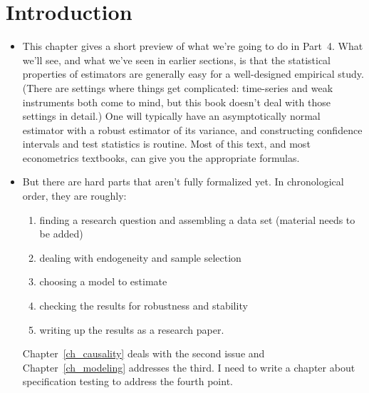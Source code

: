 

\section{Introduction}

\begin{itemize}[leftmargin=0pt]

\item This chapter gives a short preview of what we're going to do in
  Part~4. What we'll see, and what we've seen in earlier sections, is
  that the statistical properties of estimators are generally easy for
  a well-designed empirical study. (There are settings where things
  get complicated: time-series and weak instruments both come to mind,
  but this book doesn't deal with those settings in detail.) One will
  typically have an asymptotically normal estimator with a robust
  estimator of its variance, and constructing confidence intervals and
  test statistics is routine.  Most of this text, and most
  econometrics textbooks, can give you the appropriate formulas.

\item But there are hard parts that aren't fully formalized yet. In
  chronological order, they are roughly:
  \begin{enumerate}
  \item finding a research question and assembling a data set
    (material needs to be added)
  \item dealing with endogeneity and sample selection
  \item choosing a model to estimate
  \item checking the results for robustness and stability
  \item writing up the results as a research paper.
  \end{enumerate}
  Chapter~\ref{ch_causality} deals with the second issue and
  Chapter~\ref{ch_modeling} addresses the third. I need to write a
  chapter about specification testing to address the fourth point.


\end{itemize}
